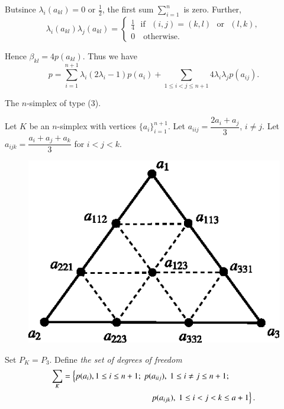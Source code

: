 \begin{example}
But\pageoriginale since $\lambda_{i}(a_{kl})=0$ or $\frac{1}{2}$, the
first sum $\sum\limits^{n}_{i=1}$ is zero. Further,
$$
\lambda_{i}(a_{kl})\lambda_{j}(a_{kl})=
\begin{cases}
\frac{1}{4}\text{~ if~ } (i,j)=(k,l)\text{~ or~ }(l,k),\\
0\quad\text{otherwise.}
\end{cases}
$$

Hence $\beta_{kl}=4p(a_{kl})$. Thus we have
\begin{equation*}
p=\sum^{n+1}_{i=1}\lambda_{i}(2\lambda_{i}-1)p(a_{i})+\sum_{1\leq
  i<j\leq
  n+1}4\lambda_{i}\lambda_{j}p(a_{ij}).\tag{4.5}\label{chap4-eq4.5} 
\end{equation*}
\end{example}

\begin{example}\label{chap4-exam4.3}
The $n$-simplex of type (3).

Let $K$ be an $n$-simplex with vertices $\{a_{i}\}^{n+1}_{i=1}$. Let
$a_{iij}=\dfrac{2a_{i}+a_{j}}{3}$, $i\neq j$. Let
$a_{ijk}=\dfrac{a_{i}+a_{j}+a_{k}}{3}$ for $i<j<k$.
\begin{figure}[H]
\centering
\includegraphics{figure/fig4.2.eps}
\caption{}\label{chap4-fig4.2}
\end{figure}

Set $P_{K}=P_{3}$. Define {\em the set of degrees of freedom}
\begin{align*}
\sum_{K} & =\left\{p(a_{i}),1\leq i\leq n+1;\ p(a_{iij}),\ 1\leq i\neq
j\leq n+1; \right. \\
&  \hspace{3.7cm}\left.  p(a_{ijk}),\ 1\leq i<j<k\leq a+1\right\}.
\end{align*}


\end{example}

